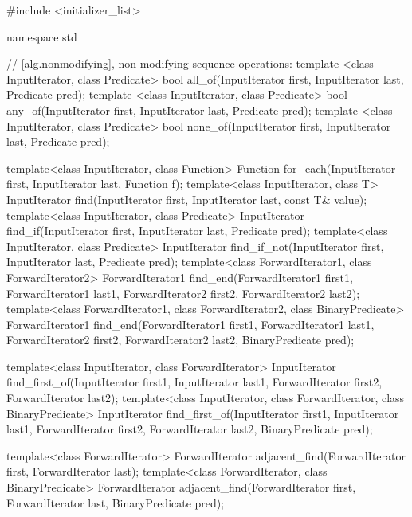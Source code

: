 \begin{codeblock}
#include <initializer_list>

namespace std {

  // \ref{alg.nonmodifying}, non-modifying sequence operations:
  template <class InputIterator, class Predicate>
    bool all_of(InputIterator first, InputIterator last, Predicate pred);
  template <class InputIterator, class Predicate>
    bool any_of(InputIterator first, InputIterator last, Predicate pred);
  template <class InputIterator, class Predicate>
    bool none_of(InputIterator first, InputIterator last, Predicate pred);

  template<class InputIterator, class Function>
    Function for_each(InputIterator first, InputIterator last, Function f);
  template<class InputIterator, class T>
    InputIterator find(InputIterator first, InputIterator last,
                       const T& value);
  template<class InputIterator, class Predicate>
    InputIterator find_if(InputIterator first, InputIterator last,
                          Predicate pred);
  template<class InputIterator, class Predicate>
    InputIterator find_if_not(InputIterator first, InputIterator last,
                              Predicate pred);
  template<class ForwardIterator1, class ForwardIterator2>
    ForwardIterator1
      find_end(ForwardIterator1 first1, ForwardIterator1 last1,
               ForwardIterator2 first2, ForwardIterator2 last2);
  template<class ForwardIterator1, class ForwardIterator2,
     class BinaryPredicate>
    ForwardIterator1
      find_end(ForwardIterator1 first1, ForwardIterator1 last1,
               ForwardIterator2 first2, ForwardIterator2 last2,
               BinaryPredicate pred);

  template<class InputIterator, class ForwardIterator>
    InputIterator
      find_first_of(InputIterator first1, InputIterator last1,
                    ForwardIterator first2, ForwardIterator last2);
  template<class InputIterator, class ForwardIterator,
     class BinaryPredicate>
    InputIterator
      find_first_of(InputIterator first1, InputIterator last1,
                    ForwardIterator first2, ForwardIterator last2,
                    BinaryPredicate pred);

  template<class ForwardIterator>
    ForwardIterator adjacent_find(ForwardIterator first,
                                  ForwardIterator last);
  template<class ForwardIterator, class BinaryPredicate>
    ForwardIterator adjacent_find(ForwardIterator first,
                                  ForwardIterator last,
                                  BinaryPredicate pred);

}
\end{codeblock}
